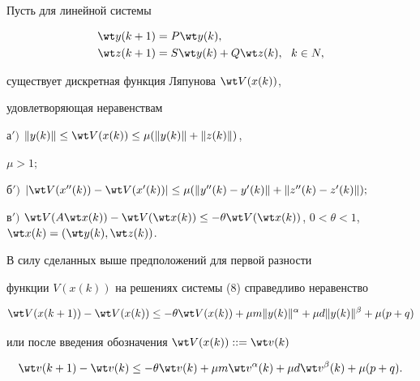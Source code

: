 Пусть для линейной системы


\begin{equation}


\begin{split}


\wt y(k+1)&=P\wt y(k),\\


\wt z(k+1)&=S\wt y(k)+Q\wt z(k),\ \ k\in N,


\end{split}


\end{equation}


существует дискретная функция Ляпунова $\wt V(x(k))$,


удовлетворяющая неравенствам





а$')$ $\|y(k)\|\le \wt V(x(k))\le\mu(\|y(k)\|+\|z(k)\|)$,


$\mu>1;$





б$')$ $|\wt V(x''(k))-\wt


V(x'(k))|\le\mu(\|y''(k)-y'(k)\|+\|z''(k)-z'(k)\|);$





в$')$ $\wt V(A\wt x(k))-\wt V(\wt x(k))\le-\theta\wt


V(\wt x(k))$, $0<\theta<1$, $\wt x(k)=(\wt y(k),\wt


z(k))$.





\noindent{}В силу сделанных выше предположений для первой разности


функции $V(x(k))$  на решениях системы (8) справедливо неравенство


$$


\wt V(x(k+1))-\wt V(x(k))\le -\theta \wt


V(x(k))+\mu m\|y(k)\|^{\alpha}+\mu d\|y(k)\|^{\beta}+\mu(p+q)


$$


или после введения обозначения $\wt V(x(k))::=\wt v(k)$


$$


\wt v(k+1)-\wt v(k)\le-\theta\wt v(k)+\mu  m\wt


v^{\alpha}(k)+\mu d\wt v^{\beta}(k)+\mu(p+q).


$$





